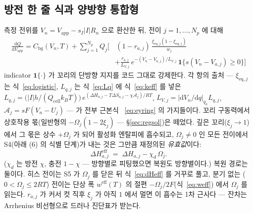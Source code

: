 \documentclass[11pt,a4paper]{article}
\newcommand{\dd}{\mathrm{d}}
\newcommand{\eff}{\mathrm{eff}}
\newcommand{\eq}{\mathrm{eq}}
\newcommand{\app}{\mathrm{app}}
\newcommand{\cell}{\mathrm{cell}}
\newcommand{\bg}{\mathrm{bg}}
\begin{document}
\subsection{방전 한 줄 식과 양방향 통합형}
측정 전위를 $V_n=V_\app-s_I|I|R_n$ 으로 환산한 뒤, 전이 $j=1,\dots,N_p$ 에 대해
\begin{equation}
\boxed{\;\begin{aligned}\frac{\dd Q}{\dd V_\app}=C_\bg(V_n,T)+\sum_{j=1}^{N_p}Q_j\bigg[&\,
(1-r_{a,j})\,\frac{\xi_{\eq,j}(1-\xi_{\eq,j})}{w_j}\\[-2pt]
&+\frac{r_{a,j}}{L_{V,j}}\,e^{-(V_n-V_{a,j})/L_{V,j}}\,\mathbf 1\{s(V_n-V_{a,j})\ge0\}\bigg]\end{aligned}\;}
\label{eq:master}
\end{equation}
indicator $\mathbf 1\{\cdot\}$ 가 꼬리의 단방향 지지를 코드 그대로 강제한다. 각 항의 출처 — $\xi_{\eq,j}$ 는
식~\eqref{eq:logistic}, $L_{q,j}$ 는 식~\eqref{eq:Lq} 에 식~\eqref{eq:keff} 를 넣은
$L_{q,j}=\big(|I|h/(Q_\cell k_BT)\big)\,e^{(\Delta H_{a,j}-T\Delta S_{a,j}-\chi\mathcal A_j)/RT}$,
$L_{V,j}=|\dd V_n/\dd q|_{q_a}L_{q,j}$, $\mathcal A_j=sF(V_n-U_j)$ — 가 전부 근본식
~\eqref{eq:eyring} 의 가지들이다. 꼬리 구동력에서 상호작용 몫(일반형의 $-\Omega_j(1-2\xi_j)$ — \S\ref{sec:regsol})은 떼었다.
깊은 꼬리($\xi_j\to1$)에서 그 몫은 상수 $+\Omega_j$ 가 되어 활성화 엔탈피에 흡수되고,
$\Omega_j\ne0$ 인 모든 전이에서 S4(아래 (6) 의 식별 단계)가 내는 것은 그만큼 재정의된
\emph{유효값}이다:
\begin{equation}
\Delta H_{a,j}^{\eff}\;=\;\Delta H_{a,j}-\chi_d\,\Omega_j.
\label{eq:dHeff}
\end{equation}
($\chi_d$ 는 방전 $\chi$, 충전 $1-\chi$ — 방향별로 피팅했으면 복원도 방향별이다.) 복원 경로는
둘이다. 히스 전이는 S5 가 $\Omega_j$ 를 닫은 뒤 식~\eqref{eq:dHeff} 를 거꾸로 풀고, 분기 없는
($0<\Omega_j\le2RT$) 전이는 단상 폭 $w^{\eff}(T)$ 의 절편 $-\Omega_j/2F$(식~\eqref{eq:weff})
에서 $\Omega_j$ 를 읽는다. $r_{a,j}$ 가 커서 컷 직후 $\xi_j$ 가 아직 $1$ 에서 멀면 이 흡수는 1차 근사다 — 잔차는
Arrhenius 비선형으로 드러나 진단표가 받는다.
\end{document}
